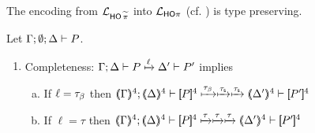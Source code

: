 \documentclass[runningheads]{llncs}
\begin{document}
{{{
\begin{proposition}
The encoding from
		$\mathcal{L}_{\mathsf{HO}\,{\widetilde{\pi}}}$ into $\mathcal{L}_{\mathsf{HO}\pi}$ (cf. )
is type preserving.
\end{proposition}}

\begin{proposition}\myrm
	\label{prop:op_corr_pHOp_to_HOp}
Let $\Gamma; \emptyset; \Delta \vdash P$.
	\begin{enumerate}[1.]
		\item	Completeness: 
			$\Gamma; \Delta \vdash P \xmapsto{\ell} \Delta' \vdash P'$ implies
%
			\begin{enumerate}[a)]
%
%
%

				\item	If $\ell = \tau_{\beta}$ then %
					$\horel{\tmap{\Gamma}{4}}{\tmap{\Delta}{4}}{\pmap{P}{4}}{\hby{\btau} \hby{\stau}  \hby{\stau}}
					{\tmap{\Delta'}{4}}{\pmap{P'}{4}}$ %

				\item	If $\ell = \tau$ then %
					$\horel{\tmap{\Gamma}{4}}{\tmap{\Delta}{4}}{\pmap{P}{4}}{\hby{\tau}\hby{\tau} \hby{\tau}}
					{\tmap{\Delta'}{4}}{\pmap{P'}{4}}$ %
			\end{enumerate}


\end{enumerate}
\end{proposition}}}
\end{document}
